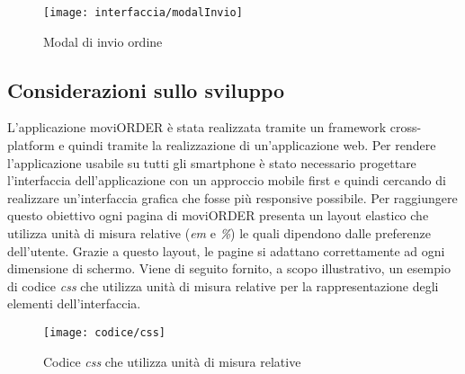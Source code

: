 \begin{figure}[!h] 
    \centering 
    \texttt{[image: interfaccia/modalInvio]} 
    \caption{Modal di invio ordine}
\end{figure}

\subsection{Considerazioni sullo sviluppo}

L'applicazione moviORDER è stata realizzata tramite un framework cross-platform e quindi tramite la realizzazione di un'applicazione web. Per rendere l'applicazione usabile su tutti gli smartphone è stato necessario progettare l'interfaccia dell'applicazione con un approccio mobile first e quindi cercando di realizzare un'interfaccia grafica che fosse più responsive possibile. Per raggiungere questo obiettivo ogni pagina di moviORDER presenta un layout elastico che utilizza unità di misura relative (\textit{em} e \textit{\%}) le quali dipendono dalle preferenze dell'utente. Grazie a questo layout, le pagine si adattano correttamente ad ogni dimensione di schermo. Viene di seguito fornito, a scopo illustrativo, un esempio di codice \textit{css} che utilizza unità di misura relative per la rappresentazione degli elementi dell'interfaccia.

\begin{figure}[!h] 
    \centering 
    \texttt{[image: codice/css]} 
    \caption{Codice \textit{css} che utilizza unità di misura relative}
\end{figure}